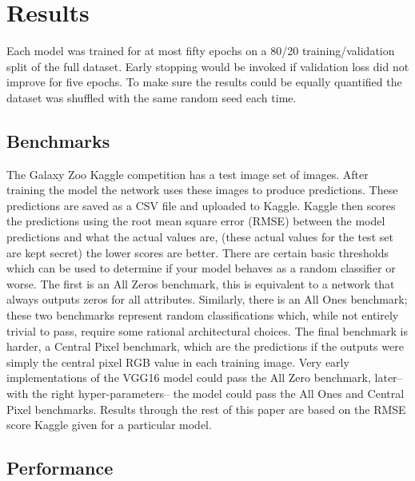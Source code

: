 \section{Results}



Each model was trained for at most fifty epochs on a 80/20 training/validation split of the full dataset. Early stopping would be invoked if validation loss did not improve for five epochs. To make sure the results could be equally quantified the dataset was shuffled with the same random seed each time.

\subsection{Benchmarks}
The Galaxy Zoo Kaggle competition has a test image set of  images. After training the model the network uses these images to produce predictions. These predictions are saved as a CSV file and uploaded to Kaggle. Kaggle then scores the predictions using the root mean square error (RMSE) between the model predictions and what the actual values are, (these actual values for the test set are kept secret) the lower scores are better. There are certain basic thresholds which can be used to determine if your model behaves as a random classifier or worse. The first is an All Zeros benchmark, this is equivalent to a network that always outputs zeros for all attributes. Similarly, there is an All Ones benchmark; these two benchmarks represent random classifications which, while not entirely trivial to pass, require some rational architectural choices. The final benchmark is harder, a Central Pixel benchmark, which are the predictions if the outputs were simply the central pixel RGB value in each training image. Very early implementations of the VGG16 model could pass the All Zero benchmark, later--with the right hyper-parameters-- the model could pass the All Ones and Central Pixel benchmarks. Results through the rest of this paper are based on the RMSE score Kaggle given for a particular model.

\subsection{Performance}


